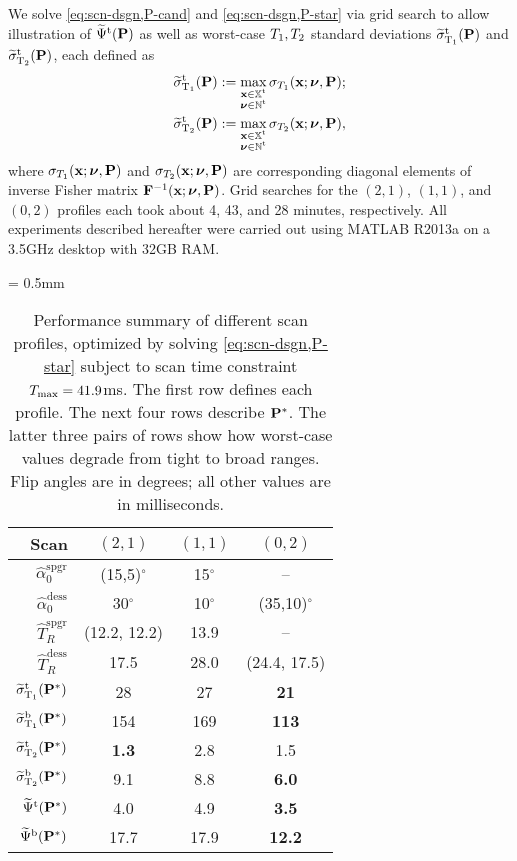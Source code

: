 We solve \eqref{eq:scn-dsgn,P-cand} and \eqref{eq:scn-dsgn,P-star} 
via grid search 
to allow illustration 
of $\widetilde{\Psi}^{\mathrm{t}}(\mathbf{P})$ 
as well as worst-case $T_1,T_2$ standard deviations 
$\widetilde{\sigma}_{\mathrm{T}_1}^\mathrm{t}(\mathbf{P})$ and $\widetilde{\sigma}_{\mathrm{T}_2}^\mathrm{t}(\mathbf{P})$, 
each defined as
\begin{align}
	\widetilde{\sigma}_{\mathrm{T}_1}^\mathrm{t}(\mathbf{P}) &:= 
		\max_{\substack{\mathbf{x} \in \mathbb{X}^\mathrm{t} \\ \boldsymbol{\nu} \in \mathbb{N}^\mathrm{t}}} 
		\sigma_{T_1}(\mathbf{x}; \boldsymbol{\nu}, \mathbf{P}); 
		\label{eq:sigwot} \\
	\widetilde{\sigma}_{\mathrm{T}_2}^\mathrm{t}(\mathbf{P}) &:= 
		\max_{\substack{\mathbf{x} \in \mathbb{X}^\mathrm{t} \\ \boldsymbol{\nu} \in \mathbb{N}^\mathrm{t}}} 
		\sigma_{T_2}(\mathbf{x}; \boldsymbol{\nu}, \mathbf{P}), 
		\label{eq:sigwtt} 
\end{align}
where $\sigma_{T_1}(\mathbf{x}; \boldsymbol{\nu}, \mathbf{P})$ 
and $\sigma_{T_2}(\mathbf{x}; \boldsymbol{\nu}, \mathbf{P})$ 
are corresponding diagonal elements 
of inverse Fisher matrix $\mathbf{F}^{-1}(\mathbf{x}; \boldsymbol{\nu}, \mathbf{P})$. 
Grid searches for the $(2,1)$, $(1,1)$, and $(0,2)$ profiles 
each took about 4, 43, and 28 minutes, respectively.
All experiments described hereafter were carried out 
using MATLAB\textsuperscript{\textregistered} R2013a 
on a 3.5GHz desktop with 32GB RAM. 

\begin{table*} [!tb]
	\centering
	{\tabulinesep = 0.5mm
	\begin{tabu} {r | c c c}
		\hline \hline 
		Scan & $(2,1)$ & $(1,1)$ & $(0,2)$ \\
		\hline
		$\widehat{\alpha}^{\mathrm{spgr}}_0$ & (15,5)$^\circ$ & 15$^\circ$ & -- \\
		$\widehat{\alpha}^{\mathrm{dess}}_0$ & 30$^\circ$ & 10$^\circ$ & (35,10)$^\circ$ \\
		$\widehat{T}_{R}^\mathrm{spgr}$ & (12.2, 12.2) & 13.9 & -- \\
		$\widehat{T}_{R}^\mathrm{dess}$ & 17.5 & 28.0 & (24.4, 17.5) \\
		\hline
		$\widetilde{\sigma}_{\mathrm{T}_1}^\mathrm{t}(\mathbf{P}^*)$ & 28 & 27 & \textbf{21} \\
		$\widetilde{\sigma}_{\mathrm{T}_1}^\mathrm{b}(\mathbf{P}^*)$ & 154 & 169 & \textbf{113} \\
		\hline
		$\widetilde{\sigma}_{\mathrm{T}_2}^\mathrm{t}(\mathbf{P}^*)$ & \textbf{1.3} & 2.8 & 1.5 \\
		$\widetilde{\sigma}_{\mathrm{T}_2}^\mathrm{b}(\mathbf{P}^*)$ & 9.1 & 8.8 & \textbf{6.0} \\
		\hline
		$\widetilde{\Psi}^{\mathrm{t}}(\mathbf{P}^*)$ & 4.0 & 4.9 & \textbf{3.5} \\
		$\widetilde{\Psi}^{\mathrm{b}}(\mathbf{P}^*)$ & 17.7 & 17.9 & \textbf{12.2} \\
		\hline \hline
	\end{tabu}}
	\vspace{1mm}
	\caption{Performance summary of different scan profiles, 
		optimized by solving \eqref{eq:scn-dsgn,P-star} subject 
		to scan time constraint $T_\mathrm{max} = 41.9$ms. 
		The first row defines each profile. 
		The next four rows describe $\mathbf{P}^*$. 
		The latter three pairs of rows 
		show how worst-case values degrade 
		from tight to broad ranges. 
		Flip angles are in degrees; 
		all other values are in milliseconds.
	}
	\label{table:profile}
\end{table*}

